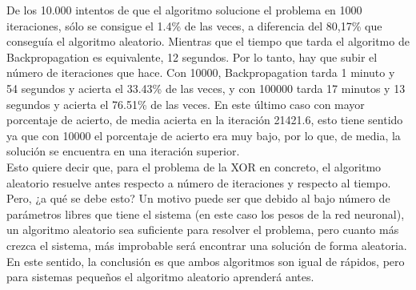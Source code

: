 De los 10.000 intentos de que el algoritmo solucione el problema en 1000 iteraciones, sólo se consigue el 1.4\% de las veces, a diferencia del 80,17\% que conseguía el algoritmo aleatorio. Mientras que el tiempo que tarda el algoritmo de Backpropagation es equivalente, 12 segundos. Por lo tanto, hay que subir el número de iteraciones que hace. Con 10000, Backpropagation tarda 1 minuto y 54 segundos y acierta el 33.43\% de las veces, y con 100000 tarda 17 minutos y 13 segundos y acierta el 76.51\% de las veces. En este último caso con mayor porcentaje de acierto, de media acierta en la iteración 21421.6, esto tiene sentido ya que con 10000 el porcentaje de acierto era muy bajo, por lo que, de media, la solución se encuentra en una iteración superior.
\\
Esto quiere decir que, para el problema de la XOR en concreto, el algoritmo aleatorio resuelve antes respecto a número de iteraciones y respecto al tiempo. Pero, ¿a qué se debe esto? Un motivo puede ser que debido al bajo número de parámetros libres que tiene el sistema (en este caso los pesos de la red neuronal), un algoritmo aleatorio sea suficiente para resolver el problema, pero cuanto más crezca el sistema, más improbable será encontrar una solución de forma aleatoria. En este sentido, la conclusión es que ambos algoritmos son igual de rápidos, pero para sistemas pequeños el algoritmo aleatorio aprenderá antes.

